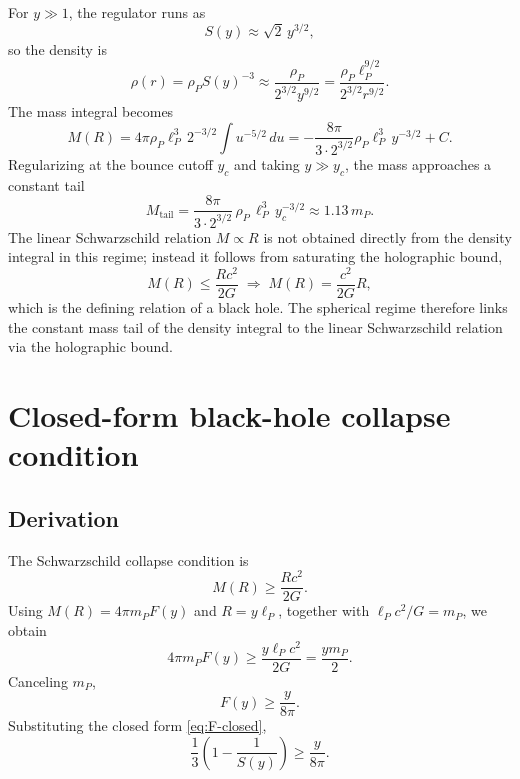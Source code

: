 \documentclass[a4paper,7pt,oneside,openany]{book}
\begin{document}
For $y\gg 1$, the regulator runs as
\begin{equation}
S(y)\approx\sqrt{2}\,y^{3/2},
\label{eq:S-high}
\end{equation}
so the density is
\begin{equation}
\rho(r)=\rho_{P}S(y)^{-3}
\approx
\frac{\rho_{P}}{2^{3/2}y^{9/2}}
=
\frac{\rho_{P}\ell_{P}^{9/2}}{2^{3/2}r^{9/2}}.
\label{eq:rho-high}
\end{equation}
The mass integral becomes
\begin{equation}
M(R)
=
4\pi\rho_{P}\ell_{P}^{3}\,2^{-3/2}
\int u^{-5/2}\,du
=
-\frac{8\pi}{3\cdot 2^{3/2}}\rho_{P}\ell_{P}^{3}\,y^{-3/2}
+
C.
\label{eq:M-high-raw}
\end{equation}
Regularizing at the bounce cutoff $y_{c}$ and taking $y\gg 
y_{c}$, the mass approaches a constant tail
\begin{equation}
M_{\text{tail}}
=
\frac{8\pi}{3\cdot 2^{3/2}}\,\rho_{P}\,\ell_{P}^{3}\,y_{c}^{-3/2}
\approx
1.13\,m_{P}.
\label{eq:M-tail}
\end{equation}
The linear Schwarzschild relation $M\propto R$ is not obtained 
directly from the density integral in this regime; instead it 
follows from saturating the holographic bound,
\begin{equation}
M(R)\le \frac{Rc^{2}}{2G}
\;\Longrightarrow\;
M(R)=\frac{c^{2}}{2G}R,
\label{eq:Schwarzschild}
\end{equation}
which is the defining relation of a black hole. The spherical 
regime therefore links the constant mass tail of the density 
integral to the linear Schwarzschild relation via the 
holographic bound.

\section{Closed-form black-hole collapse condition}

\subsection{Derivation}

The Schwarzschild collapse condition is
\begin{equation}
M(R)\ge\frac{Rc^{2}}{2G}.
\label{eq:collapse}
\end{equation}
Using $M(R)=4\pi m_{P}F(y)$ and $R=y\ell_{P}$, together with 
$\ell_{P}c^{2}/G=m_{P}$, we obtain
\begin{equation}
4\pi m_{P}F(y)\ge\frac{y\ell_{P}c^{2}}{2G}
=\frac{y m_{P}}{2}.
\label{eq:collapse-step1}
\end{equation}
Canceling $m_{P}$,
\begin{equation}
\boxed{\;F(y)\ge\frac{y}{8\pi}.\;}
\label{eq:collapse-condition}
\end{equation}
Substituting the closed form \eqref{eq:F-closed},
\begin{equation}
\frac{1}{3}\left(1-\frac{1}{S(y)}\right)\ge\frac{y}{8\pi}.
\label{eq:collapse-final}
\end{equation}
\end{document}
